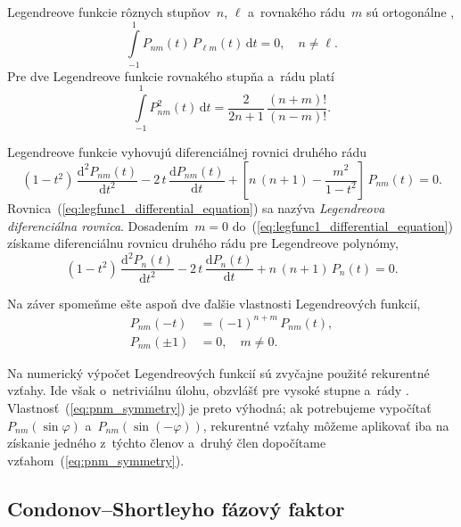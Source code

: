 \documentclass[a4paper,12pt]{book}
\newcommand{\diff}{\mathrm d}
\begin{document}
Legendreove funkcie rôznych stupňov~$n$, $\ell$ a~rovnakého rádu~$m$ sú
ortogonálne \parencite{Freeden2009},
%
\begin{equation}
\label{eq:pnm_orthogonality}
\int\limits_{-1}^{1} P_{nm}(t) \, P_{\ell m}(t) \, \diff t = 0{,} \quad n \neq 
\ell{.}
\end{equation}
%
Pre dve Legendreove funkcie rovnakého stupňa a~rádu platí
\begin{equation}
\label{eq:pnm_times_pnm}
\int\limits_{-1}^{1} P^2_{nm}(t) \, \diff t = \frac{2}{2n + 1} \, \frac{(n 
+ m)!}{(n - m)!}{.}
\end{equation}

Legendreove funkcie vyhovujú diferenciálnej rovnici druhého rádu 
\parencite{SansoGeoidDetermination}
%
\begin{equation}
\label{eq:legfunc1_differential_equation}
(1 - t^2) \, \frac{\diff^2 P_{nm}(t)}{\diff t^2} - 2 \, t \, \frac{\diff 
P_{nm}(t)}{\diff t} + \left[ n \, (n + 1) - \frac{m^2}{1 - t^2} \right] \, 
P_{nm}(t) = 0{.}
\end{equation}
%
Rovnica~(\ref{eq:legfunc1_differential_equation}) sa nazýva \emph{Legendreova 
diferenciálna rovnica}.  Dosadením~$m = 0$ 
do~(\ref{eq:legfunc1_differential_equation}) získame diferenciálnu rovnicu 
druhého rádu pre Legendreove polynómy,
%
\begin{equation}
\label{eq:legpol_differential_equation}
(1 - t^2) \, \frac{\diff^2 P_n(t)}{\diff t^2} - 2 \, t \, \frac{\diff 
P_n(t)}{\diff t} + n \, (n + 1) \, P_n(t) = 0{.}
\end{equation}

Na záver spomeňme ešte aspoň dve ďalšie vlastnosti Legendreových funkcií,
%
\begin{align}
\label{eq:pnm_symmetry}
P_{nm}(-t) &= (-1)^{n + m} \, P_{nm}(t){,}\\
%
P_{nm}(\pm1) &= 0{,} \quad m \neq 0{.}
\end{align}

Na numerický výpočet Legendreových funkcií sú zvyčajne použité rekurentné 
vzťahy.  Ide však o~netriviálnu úlohu, obzvlášť pre vysoké stupne a~rády 
\parencite{Holmes2002a,Fukushima2012a,Ishioka2018}.  
Vlastnosť~(\ref{eq:pnm_symmetry}) je preto výhodná; ak potrebujeme vypočítať 
$P_{nm}(\sin\varphi)$ a~$P_{nm}(\sin(-\varphi))$, rekurentné vzťahy môžeme 
aplikovať iba na získanie jedného z~týchto členov a~druhý člen dopočítame 
vzťahom~(\ref{eq:pnm_symmetry}).

\subsection{Condonov--Shortleyho fázový faktor}
\label{sec:legendre_functions_cs_factor}
\end{document}
